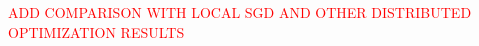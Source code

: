 \textcolor{red}{ADD COMPARISON WITH LOCAL SGD AND OTHER DISTRIBUTED OPTIMIZATION RESULTS}
















